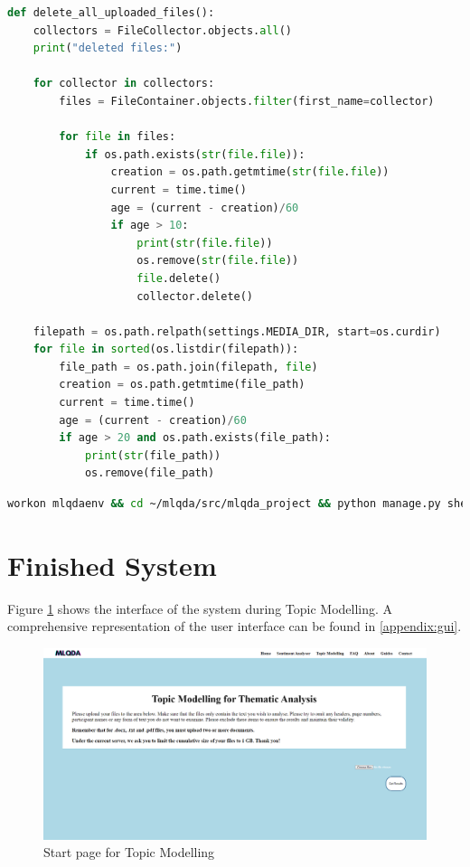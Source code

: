 \documentclass{l4proj}
\begin{document}
\begin{lstlisting}[language=python,
caption={Function to find and delete all files from analysis.},
label=lst:mlqda_delete_files]
def delete_all_uploaded_files():
    collectors = FileCollector.objects.all()
    print("deleted files:")

    for collector in collectors:
        files = FileContainer.objects.filter(first_name=collector)

        for file in files:
            if os.path.exists(str(file.file)):
                creation = os.path.getmtime(str(file.file))
                current = time.time()
                age = (current - creation)/60
                if age > 10:
                    print(str(file.file))
                    os.remove(str(file.file))
                    file.delete()
                    collector.delete()

    filepath = os.path.relpath(settings.MEDIA_DIR, start=os.curdir)
    for file in sorted(os.listdir(filepath)):
        file_path = os.path.join(filepath, file)
        creation = os.path.getmtime(file_path)
        current = time.time()
        age = (current - creation)/60
        if age > 20 and os.path.exists(file_path):
            print(str(file_path))
            os.remove(file_path)
\end{lstlisting}
\newpage
\begin{lstlisting}[language=bash,
caption={Shell script to execute file deletion.},
label=lst:mlqda_automated_deletion]
workon mlqdaenv && cd ~/mlqda/src/mlqda_project && python manage.py shell < "mlqda/file_cleanup.py"	

\end{lstlisting}

\section{Finished System}
Figure \ref{fig:mlqda_tm_start_example} shows the interface of the system during Topic Modelling. A comprehensive representation of the user interface can be found in \ref{appendix:gui}.

\begin{figure}[H]
\centering
    \includegraphics[width=0.95\linewidth]{images/tm_start.png}
    \caption{Start page for Topic Modelling}
    \label{fig:mlqda_tm_start_example} 
\end{figure}
\end{document}
